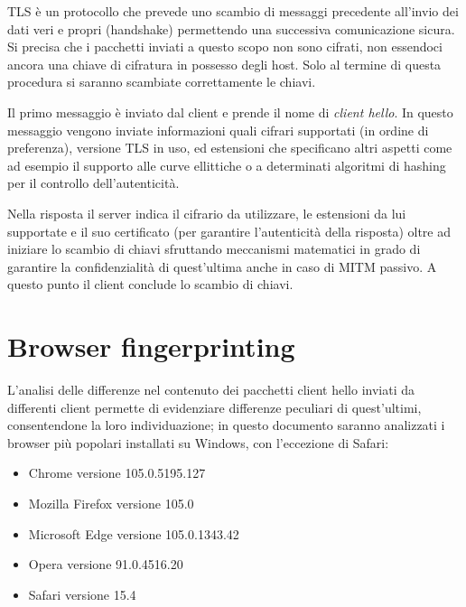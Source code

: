 TLS è un protocollo che prevede uno scambio di messaggi precedente all'invio dei dati veri e propri (handshake) permettendo una successiva comunicazione sicura. Si precisa che i pacchetti inviati a questo scopo non sono cifrati, non essendoci ancora una chiave di cifratura in possesso degli host. Solo al termine di questa procedura si saranno scambiate correttamente le chiavi.

Il primo messaggio è inviato dal client e prende il nome di \textit{client hello}. In questo messaggio vengono inviate informazioni quali cifrari supportati (in ordine di preferenza), versione TLS in uso, ed estensioni che specificano altri aspetti come ad esempio il supporto alle curve ellittiche o a determinati algoritmi di hashing per il controllo dell'autenticità.

Nella risposta il server indica il cifrario da utilizzare, le estensioni da lui supportate e il suo certificato (per garantire l'autenticità della risposta) oltre ad iniziare lo scambio di chiavi sfruttando meccanismi matematici in grado di garantire la confidenzialità di quest'ultima anche in caso di MITM passivo.
A questo punto il client conclude lo scambio di chiavi.

\section{Browser fingerprinting}
L'analisi delle differenze nel contenuto dei pacchetti client hello inviati da differenti client permette di evidenziare differenze peculiari di quest'ultimi, consentendone la loro individuazione; in questo documento saranno analizzati i browser più popolari installati su Windows, con l'eccezione di Safari:
\begin{itemize}
	\item Chrome versione 105.0.5195.127
	\item Mozilla Firefox versione 105.0
	\item Microsoft Edge versione 105.0.1343.42
	\item Opera versione 91.0.4516.20
	\item Safari versione 15.4
\end{itemize}

